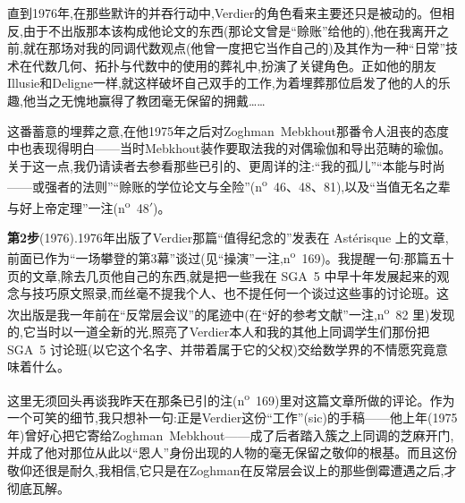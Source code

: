 直到1976年,在那些默许的并吞行动中,Verdier的角色看来主要还只是被动的。但相反,由于不出版那本该构成他论文的东西(那论文曾是“赊账”给他的),他在我离开之前,就在那场对我的同调代数观点(他曾一度把它当作自己的)及其作为一种“日常”技术在代数几何、拓扑与代数中的使用的葬礼中,扮演了关键角色。正如他的朋友Illusie和Deligne一样,就这样破坏自己双手的工作,为着埋葬那位启发了他的人的乐趣,他当之无愧地赢得了教团毫无保留的拥戴……

这番蓄意的埋葬之意,在他1975年之后对Zoghman~Mebkhout那番令人沮丧的态度中也表现得明白——当时Mebkhout装作要取法我的对偶瑜伽和导出范畴的瑜伽。关于这一点,我仍请读者去参看那些已引的、更周详的注:“我的孤儿”“本能与时尚——或强者的法则”“赊账的学位论文与全险”(n\textsuperscript{o}~46、48、81),以及“当值无名之辈与好上帝定理”一注(n\textsuperscript{o}~48$'$)。

\textbf{第2步}(1976).1976年出版了Verdier那篇“值得纪念的”发表在 Astérisque 上的文章\dmark{},前面已作为“一场攀登的第3幕”谈过(见“操演”一注,n\textsuperscript{o}~169)。我提醒一句:那篇五十页的文章,除去几页他自己的东西,就是把一些我在 SGA~5 中早十年发展起来的观念与技巧原文照录,而丝毫不提我个人、也不提任何一个谈过这些事的讨论班。这次出版是我一年前在“反常层会议”的尾迹中(在“好的参考文献”一注,n\textsuperscript{o}~82 里)发现的,它当时以一道全新的光,照亮了Verdier本人和我的其他上同调学生们那份把 SGA~5 讨论班(以它这个名字、并带着属于它的父权)交给数学界的不情愿究竟意味着什么。

这里无须回头再谈我昨天在那条已引的注(n\textsuperscript{o}~169)里对这篇文章所做的评论。作为一个可笑的细节,我只想补一句:正是Verdier这份“工作”(sic)的手稿——他上年(1975年)曾好心把它寄给Zoghman~Mebkhout——成了后者踏入簇之上同调的芝麻开门,并成了他对那位从此以“恩人”身份出现的人物的毫无保留之敬仰的根基。而且这份敬仰还很是耐久,我相信,它只是在Zoghman在反常层会议上的那些倒霉遭遇之后,才彻底瓦解。

